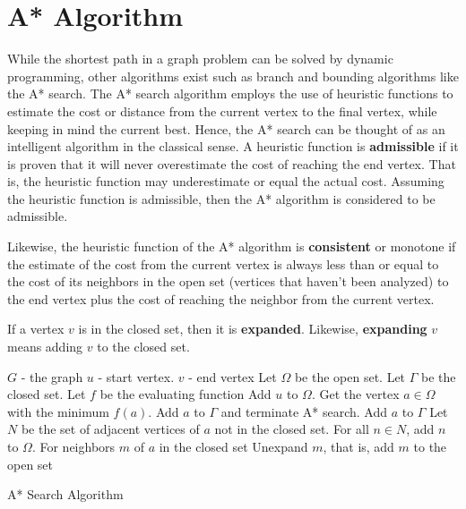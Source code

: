 \section{A* Algorithm}
While the shortest path in a graph problem can be solved by dynamic programming, other algorithms exist such as branch and bounding algorithms 
like the A* search.\cite{HartNilssonRaphael1968} The A* search algorithm employs the use of heuristic functions to estimate the cost
or distance from the current vertex to the final vertex, while keeping in mind the current best. Hence, the A* search can be thought of 
as an intelligent algorithm in the classical sense. A heuristic function is \textbf{admissible} if it is proven that it will never 
overestimate the cost of reaching the end vertex. That is, the heuristic function may underestimate or equal the actual cost. 
Assuming the heuristic function is admissible, then the A* algorithm is considered to be admissible. 

Likewise, the heuristic function of the A* algorithm is \textbf{consistent} or monotone if the estimate of the cost from the current 
vertex is always less than or equal to the cost of its neighbors in the open set (vertices that haven't been analyzed) to the end vertex
plus the cost of reaching the neighbor from the current vertex.

\begin{definition}
    If a vertex $v$ is in the closed set, then it is \textbf{expanded}. Likewise, \textbf{expanding} $v$ means adding $v$ to the closed set.
\end{definition}

\begin{algorithm}[H]
    \begin{algorithmic}[1]
        \REQUIRE $G$ - the graph
        \REQUIRE $u$ - start vertex.
        \REQUIRE $v$ - end vertex 
        \STATE Let $\Omega$ be the open set.
        \STATE Let $\Gamma$ be the closed set.
        \STATE Let $f$ be the evaluating function
        \STATE Add $u$ to $\Omega$.
        \WHILE {$\Omega\neq\varnothing$}
            \STATE Get the vertex $a\in\Omega$ with the minimum $f(a)$.
                \STATE Add $a$ to $\Gamma$ and terminate A* search.
            \ELSE 
                \STATE Add $a$ to $\Gamma$
                \STATE Let $N$ be the set of adjacent vertices of $a$ not in the closed set.
                \STATE For all $n\in N$, add $n$ to $\Omega$.
                \STATE For neighbors $m$ of $a$ in the closed set
                    \STATE Unexpand $m$, that is, add $m$ to the open set 
                \ENDIF
            \ENDIF
        \ENDWHILE
    \end{algorithmic}
    \caption{A* Search Algorithm}
\end{algorithm}

